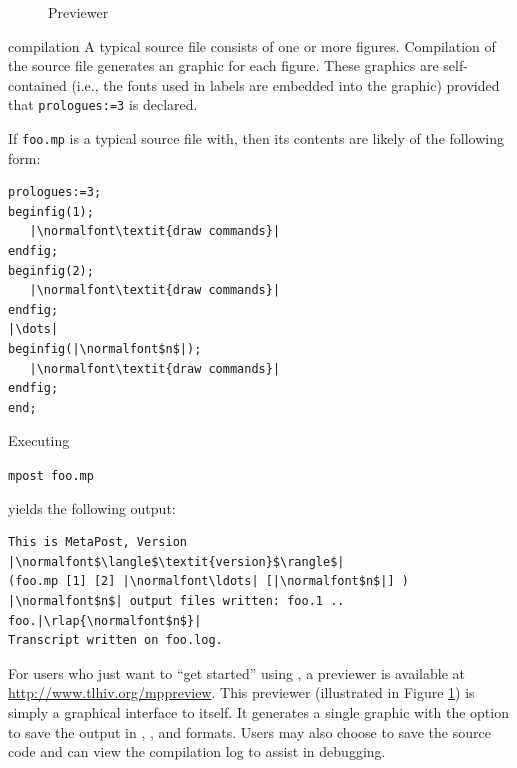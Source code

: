 \begin{figure}
	\begin{center}
		\caption{\MP{} Previewer}\label{fig:previewer}
	\end{center}
\end{figure}

\begin{section}{\MP{} compilation}
A typical \MP{} source file consists of one or more figures.  Compilation of the source file generates an \EPS{} graphic for each figure.  These \EPS{} graphics are self-contained (i.e., the fonts used in labels are embedded into the graphic) provided that \lstinline{prologues:=3} is declared.

If \texttt{foo.mp} is a typical \MP{} source file with, then its contents are likely of the following form:
\begin{lstlisting}[xleftmargin=1.25\parindent]
prologues:=3;
beginfig(1);
   |\normalfont\textit{draw commands}|
endfig;
beginfig(2);
   |\normalfont\textit{draw commands}|
endfig;
|\dots|
beginfig(|\normalfont$n$|);
   |\normalfont\textit{draw commands}|
endfig;
end;
\end{lstlisting}
Executing \begin{flushleft}\hspace*{1.25\parindent}\texttt{mpost foo.mp}\end{flushleft} yields the following output:
\begin{lstlisting}[xleftmargin=1.25\parindent]
This is MetaPost, Version |\normalfont$\langle$\textit{version}$\rangle$|
(foo.mp [1] [2] |\normalfont\ldots| [|\normalfont$n$|] )
|\normalfont$n$| output files written: foo.1 .. foo.|\rlap{\normalfont$n$}|
Transcript written on foo.log.
\end{lstlisting}

For users who just want to ``get started'' using \MP{}, a \MP{} previewer is available at \url{http://www.tlhiv.org/mppreview}.  This previewer (illustrated in Figure \ref{fig:previewer}) is simply a graphical interface to \MP{} itself.
It generates a single graphic with the option to save the output in \EPS{}, \PDF{}, and \SVG{} formats.  Users may also choose to save the source code and can view the compilation log to assist in debugging.
\end{section}

